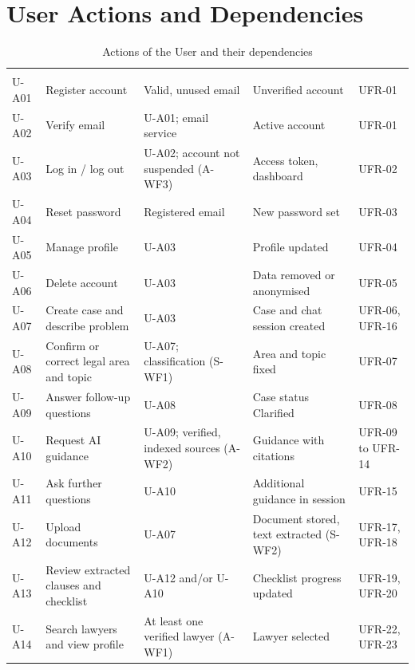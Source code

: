 \section{User Actions and Dependencies}

\begin{longtable}{|L{2.06cm}|L{3.43cm}|L{2.92cm}|L{3.43cm}|L{1.70cm}|}
\caption{Actions of the User and their dependencies}\label{tab:2.1}\\
\hline\headrow {} &  &  &  &  \\ \hline
\endfirsthead
\hline\headrow {} &  &  &  &  \\ \hline
\endhead
\hline\endlastfoot
U-A01 & Register account & Valid, unused email & Unverified account & UFR-01 \\ \hline
U-A02 & Verify email & U-A01; email service & Active account & UFR-01 \\ \hline
U-A03 & Log in / log out & U-A02; account not suspended (A-WF3) & Access token, dashboard & UFR-02 \\ \hline
U-A04 & Reset password & Registered email & New password set & UFR-03 \\ \hline
U-A05 & Manage profile & U-A03 & Profile updated & UFR-04 \\ \hline
U-A06 & Delete account & U-A03 & Data removed or anonymised & UFR-05 \\ \hline
U-A07 & Create case and describe problem & U-A03 & Case and chat session created & UFR-06, UFR-16 \\ \hline
U-A08 & Confirm or correct legal area and topic & U-A07; classification (S-WF1) & Area and topic fixed & UFR-07 \\ \hline
U-A09 & Answer follow-up questions & U-A08 & Case status Clarified & UFR-08 \\ \hline
U-A10 & Request AI guidance & U-A09; verified, indexed sources (A-WF2) & Guidance with citations & UFR-09 to UFR-14 \\ \hline
U-A11 & Ask further questions & U-A10 & Additional guidance in session & UFR-15 \\ \hline
U-A12 & Upload documents & U-A07 & Document stored, text extracted (S-WF2) & UFR-17, UFR-18 \\ \hline
U-A13 & Review extracted clauses and checklist & U-A12 and/or U-A10 & Checklist progress updated & UFR-19, UFR-20 \\ \hline
U-A14 & Search lawyers and view profile & At least one verified lawyer (A-WF1) & Lawyer selected & UFR-22, UFR-23 \\ \hline

\end{longtable}
